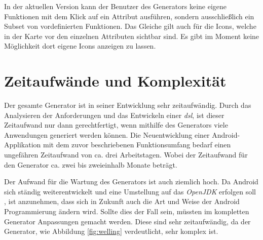In der aktuellen Version kann der Benutzer des Generators keine eigene Funktionen mit dem Klick auf ein Attribut ausführen, sondern ausschließlich ein Subset von vordefinierten Funktionen. Das Gleiche gilt auch für die Icons, welche in der Karte vor den einzelnen Attributen sichtbar sind. Es gibt im Moment keine Möglichkeit dort eigene Icons anzeigen zu lassen.

\section{Zeitaufwände und Komplexität}

Der gesamte Generator ist in seiner Entwicklung sehr zeitaufwändig. Durch das Analysieren der Anforderungen und das Entwickeln einer \textit{\acf{dsl}}, ist dieser Zeitaufwand nur dann gerechtfertigt, wenn mithilfe des Generators viele Anwendungen generiert werden können. Die Neuentwicklung einer Android-Applikation mit dem zuvor beschriebenen Funktionsumfang bedarf einen ungefähren Zeitaufwand von ca. drei Arbeitstagen. Wobei der Zeitaufwand für den Generator ca. zwei bis zweieinhalb Monate beträgt.

Der Aufwand für die Wartung des Generators ist auch ziemlich hoch. Da Android sich ständig weiterentwickelt und eine Umstellung auf das \textit{OpenJDK} erfolgen soll \cite{jdk}, ist anzunehmen, dass sich in Zukunft auch die Art und Weise der Android Programmierung ändern wird. Sollte dies der Fall sein, müssten im kompletten Generator Anpassungen gemacht werden. Diese sind sehr zeitaufwändig, da der Generator, wie Abbildung \ref{fig:welling} verdeutlicht, sehr komplex ist.

